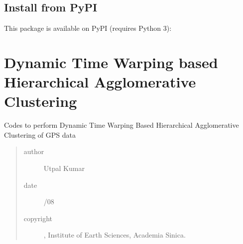 \documentclass[letterpaper,10pt,english]{sphinxmanual}
\begin{document}
\section{Install from PyPI}
\label{\detokenize{usage/install:install-from-pypi}}
\sphinxAtStartPar
This package is available on PyPI (requires Python 3):

\begin{sphinxVerbatim}[commandchars=\\\{\}]
  
\end{sphinxVerbatim}
\label{\detokenize{modules/module_contents:module-dtwhaclustering}}

\chapter{Dynamic Time Warping based Hierarchical Agglomerative Clustering}
\label{\detokenize{modules/module_contents:dynamic-time-warping-based-hierarchical-agglomerative-clustering}}\label{\detokenize{modules/module_contents::doc}}
\sphinxAtStartPar
Codes to perform Dynamic Time Warping Based Hierarchical Agglomerative Clustering of GPS data
\begin{quote}\begin{description}
\item[{author}] \leavevmode
\sphinxAtStartPar
Utpal Kumar

\item[{date}] \leavevmode
{}/08

\item[{copyright}] \leavevmode
{}, Institute of Earth Sciences, Academia Sinica.

\end{description}\end{quote}
\end{document}

